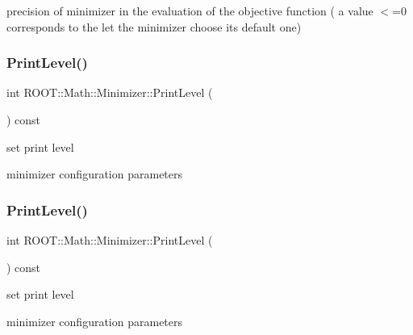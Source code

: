 precision of minimizer in the evaluation of the objective function ( a value $<$=0 corresponds to the let the minimizer choose its default one) \mbox{\label{classROOT_1_1Math_1_1Minimizer_ae6c76dc2f3073f19edf22561866c2f9c}} 
\subsubsection{\texorpdfstring{PrintLevel()}{PrintLevel()}\hspace{0.1cm}{\footnotesize\ttfamily [1/2]}}
{\footnotesize\ttfamily int R\+O\+O\+T\+::\+Math\+::\+Minimizer\+::\+Print\+Level (\begin{DoxyParamCaption}{ }\end{DoxyParamCaption}) const\hspace{0.3cm}{\ttfamily [inline]}}



set print level 

minimizer configuration parameters \mbox{\label{classROOT_1_1Math_1_1Minimizer_ae6c76dc2f3073f19edf22561866c2f9c}} 
\subsubsection{\texorpdfstring{PrintLevel()}{PrintLevel()}\hspace{0.1cm}{\footnotesize\ttfamily [2/2]}}
{\footnotesize\ttfamily int R\+O\+O\+T\+::\+Math\+::\+Minimizer\+::\+Print\+Level (\begin{DoxyParamCaption}{ }\end{DoxyParamCaption}) const\hspace{0.3cm}{\ttfamily [inline]}}



set print level 

minimizer configuration parameters \mbox{\label{classROOT_1_1Math_1_1Minimizer_aea1c5d69c6a1c1f2cf4d17a523862560}} 
